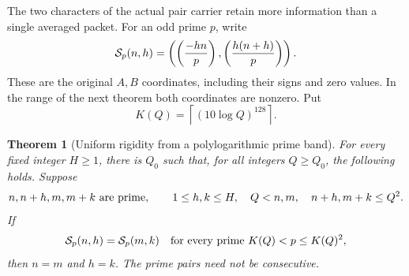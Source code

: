 \documentclass[11pt]{article}
\newtheorem{theorem}{Theorem}[section]
\begin{document}
The two characters of the actual pair carrier retain more information
than a single averaged packet.  For an odd prime \(p\), write
\[
 {\cal S}_p(n,h)=
 \left(\left(\frac{-hn}{p}\right),
       \left(\frac{h(n+h)}{p}\right)\right).
\]
These are the original \(A,B\) coordinates, including their signs and
zero values.  In the range of the next theorem both coordinates are
nonzero.  Put
\[
 K(Q)=\left\lceil(10\log Q)^{128}\right\rceil.
\]

\begin{theorem}[Uniform rigidity from a polylogarithmic prime band]
\label{thm:integer-signature-return}
For every fixed integer \(H\ge1\), there is \(Q_0\) such that, for all
integers \(Q\ge Q_0\), the following holds.  Suppose
\[
 n,n+h,m,m+k\ \hbox{are prime},\qquad
 1\le h,k\le H,\quad Q<n,m,\quad n+h,m+k\le Q^2.
\]
If
\[
 {\cal S}_p(n,h)={\cal S}_p(m,k)
 \quad\hbox{for every prime }K(Q)<p\le K(Q)^2,
\]
then \(n=m\) and \(h=k\).
The prime pairs need not be consecutive.
\end{theorem}
\end{document}
